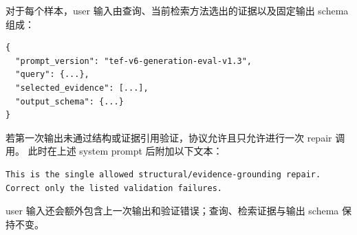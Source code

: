 对于每个样本，user 输入由查询、当前检索方法选出的证据以及固定输出 schema 组成：

\begin{lstlisting}
{
  "prompt_version": "tef-v6-generation-eval-v1.3",
  "query": {...},
  "selected_evidence": [...],
  "output_schema": {...}
}
\end{lstlisting}

若第一次输出未通过结构或证据引用验证，协议允许且只允许进行一次 repair 调用。
此时在上述 system prompt 后附加以下文本：

\begin{lstlisting}
This is the single allowed structural/evidence-grounding repair.
Correct only the listed validation failures.
\end{lstlisting}

user 输入还会额外包含上一次输出和验证错误；查询、检索证据与输出 schema 保持不变。
